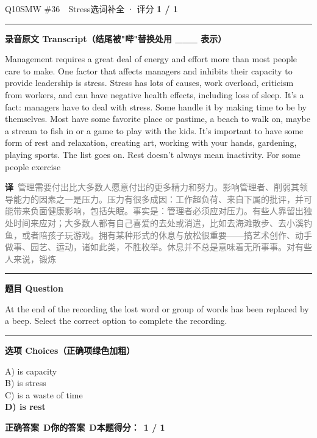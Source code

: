\documentclass[11pt]{article}
\newcommand{\ptesub}[1]{%
  \par\needspace{2\baselineskip}\smallskip
  {\color{cAccent}\rule[-0.2ex]{3pt}{1.05em}}\hspace{6pt}%
  {\bfseries\color{cHead}#1}\par\nopagebreak\smallskip}
\newcommand{\zh}[1]{{\footnotesize\textcolor{cNote}{\textbf{译}}\ \textcolor{gray}{#1}}}
\begin{document}
\begin{qblock}{Q10\quad SMW \#36\ \ Stress}{选词补全 · 评分 \textcolor{cAccent}{\bfseries 1 / 1}}
\ptesub{录音原文 Transcript（结尾被"哔"替换处用 \_\_\_ 表示）}
\begin{promptbox}
Management requires a great deal of energy and effort more than most people care to make. One factor that affects managers and inhibits their capacity to provide leadership is stress. Stress has lots of causes, work overload, criticism from workers, and can have negative health effects, including loss of sleep. It's a fact: managers have to deal with stress. Some handle it by making time to be by themselves. Most have some favorite place or pastime, a beach to walk on, maybe a stream to fish in or a game to play with the kids. It's important to have some form of rest and relaxation, creating art, working with your hands, gardening, playing sports. The list goes on. Rest doesn't always mean inactivity. For some people exercise \underline{\hspace{2.2cm}}
\end{promptbox}
\zh{管理需要付出比大多数人愿意付出的更多精力和努力。影响管理者、削弱其领导能力的因素之一是压力。压力有很多成因：工作超负荷、来自下属的批评，并可能带来负面健康影响，包括失眠。事实是：管理者必须应对压力。有些人靠留出独处时间来应对；大多数人都有自己喜爱的去处或消遣，比如去海滩散步、去小溪钓鱼，或者陪孩子玩游戏。拥有某种形式的休息与放松很重要——搞艺术创作、动手做事、园艺、运动，诸如此类，不胜枚举。休息并不总是意味着无所事事。对有些人来说，锻炼\underline{\hspace{1.5cm}}}
\ptesub{题目 Question}
\begin{notebox}At the end of the recording the lost word or group of words has been replaced by a beep. Select the correct option to complete the recording.\end{notebox}
\ptesub{选项 Choices（正确项绿色加粗）}
{\small
A) is capacity\\
B) is stress\\
C) is a waste of time\\
{\color{cFix}\textbf{D) is rest}}}
\par\smallskip
\textbf{正确答案}\ \textcolor{cFix}{\bfseries D}\qquad\textbf{你的答案}\ \textcolor{cFix}{\bfseries D}\qquad\textbf{本题得分：}\ {\color{cAccent}\bfseries 1 / 1}
\end{qblock}
\end{document}
